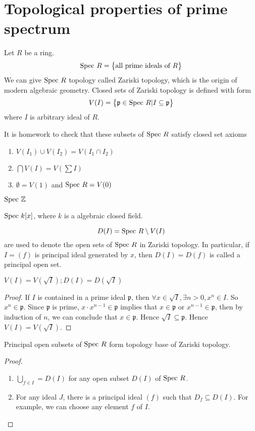 \section{Topological properties of prime spectrum}
Let $R$ be a ring.
\[
\text{Spec } R = \big\{\text{all prime ideals of }R  \big\}
\]
We can give $\text{Spec } R$ topology called Zariski topology, which is the origin of modern algebraic geometry. Closed sets of Zariski topology is defined with form 
\[
V(I) = \big\{ \mathfrak{p} \in \text{Spec } R | I \subseteq \mathfrak{p}\big\}
\]
where $I$ is arbitrary ideal of $R$.

It is homework to check that these subsets of $\text{Spec } R$ satisfy closed set axioms
\begin{enumerate}
\item $V(I_1) \cup V(I_2 )= V(I_1 \cap I_2)$ 
\item $\bigcap V(I) = V(\sum I)$
\item $\emptyset = V(1)$ and $\text{Spec } R = V(0)$
\end{enumerate}

\begin{ex}
$\text{Spec } \mathbb{Z}$

$\text{Spec } k[ x]$, where $k$ is a algebraic closed field.
\end{ex}
\[ D(I) = \text{Spec } R \setminus V(I)\]
are used to denote the open sets of $\text{Spec } R$ in Zariski topology. In particular, if $I =(f)$ is principal ideal generated by $x$, then $D(I)= D(f)$ is called a principal open set.
\begin{secprop}
$V(I) = V(\sqrt{I}); D(I)= D(\sqrt{I})$ 
\end{secprop}
\begin{proof}
If $I$ is contained in a prime ideal $\mathfrak{p}$, then $ \forall x \in \sqrt{I}, \exists n >0, x^n \in I$. So $x^n \in \mathfrak{p}$. Since $\mathfrak{p}$ is prime, $x \cdot x^{n-1} \in \mathfrak{p}$ implies that $x \in \mathfrak{p}$ or $x^{n-1} \in \mathfrak{p}$, then by induction of $n$, we can conclude that $x \in \mathfrak{p}$. Hence $\sqrt{I} \subseteq \mathfrak{p}$. Hence $V(I) = V( \sqrt{I})$.
\end{proof}
\begin{secprop}
Principal open subsets of $\text{Spec } R$ form topology base of Zariski topology.
\end{secprop}
\begin{proof}
\begin{enumerate}
\item $\bigcup_{f \in I} = D(I)$ for any open subset $D(I)$ of  $\text{Spec } R$. 
\item For any ideal $J$, there is a principal ideal $(f)$ such that $D_f \subseteq D(I)$. For example, we can choose any element $f$ of $I$.
\end{enumerate}
\end{proof}

